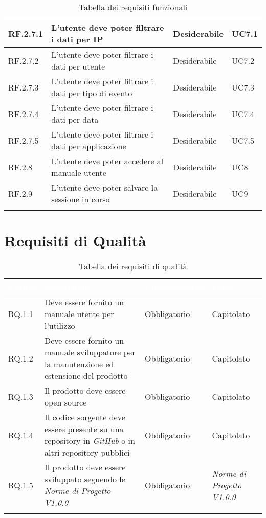 \begin{center}
\begin{longtable}{|L{2cm}|C{5,5cm}|C{3cm}|C{2cm}|}
    RF.2.7.1 & L'utente deve poter filtrare i dati per IP & Desiderabile & UC7.1 \\ \hline
    RF.2.7.2 & L'utente deve poter filtrare i dati per utente & Desiderabile & UC7.2 \\ \hline
    RF.2.7.3 & L'utente deve poter filtrare i dati per tipo di evento & Desiderabile & UC7.3 \\ \hline
    RF.2.7.4 & L'utente deve poter filtrare i dati per data & Desiderabile & UC7.4 \\ \hline
    RF.2.7.5 & L'utente deve poter filtrare i dati per applicazione & Desiderabile & UC7.5 \\ \hline
    RF.2.8 & L'utente deve poter accedere al manuale utente & Desiderabile & UC8 \\ \hline
    RF.2.9 & L'utente deve poter salvare la sessione in corso & Desiderabile & UC9 \\ \hline

    \caption{Tabella dei requisiti funzionali}
  \end{longtable}
\end{center}

\section{Requisiti di Qualità}
\begin{center}
  \centering
  \begin{longtable}{|L{2cm}|C{5,5cm}|C{3cm}|C{2cm}|}
    \hline
    \textcolor[HTML]{FFFFFF}{\textbf{Codice}} & \textcolor[HTML]{FFFFFF}{\textbf{Descrizione}} & \textcolor[HTML]{FFFFFF}{\textbf{Classificazione}} & \textcolor[HTML]{FFFFFF}{\textbf{Fonti}}
    \\ \hline
    RQ.1.1 & Deve essere fornito un manuale utente per l'utilizzo & Obbligatorio & Capitolato \\ \hline
    RQ.1.2 & Deve essere fornito un manuale sviluppatore per la manutenzione ed estensione del prodotto & Obbligatorio & Capitolato \\ \hline
    RQ.1.3 & Il prodotto deve essere open source & Obbligatorio & Capitolato \\ \hline
    RQ.1.4 & Il codice sorgente deve essere presente su una repository in \textit{GitHub} o in altri repository pubblici & Obbligatorio & Capitolato \\ \hline
    RQ.1.5 & Il prodotto deve essere sviluppato seguendo le \textit{Norme di Progetto V1.0.0} & Obbligatorio & \textit{Norme di Progetto V1.0.0} \\ \hline

    \caption{Tabella dei requisiti di qualità}
  \end{longtable}
\end{center}


